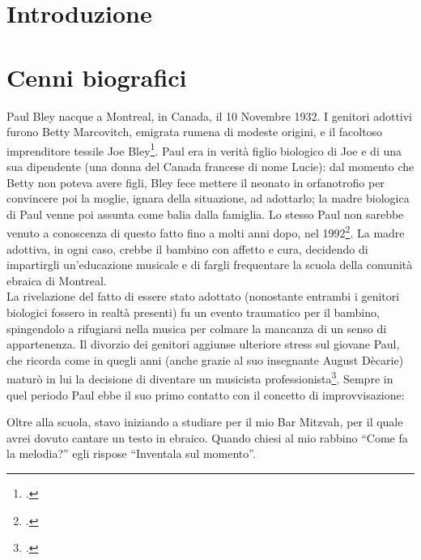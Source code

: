 \chapter{Introduzione}
\chapter{Cenni biografici}
Paul Bley nacque a Montreal, in Canada, il 10 Novembre 1932. I genitori adottivi furono Betty Marcovitch, emigrata rumena di modeste origini, e il facoltoso imprenditore tessile Joe Bley\footcite[10]{stopping}. Paul era in verità figlio biologico di Joe e di una sua dipendente (una donna del Canada francese di nome Lucie): dal momento che Betty non poteva avere figli, Bley fece mettere il neonato in orfanotrofio per convincere poi la moglie, ignara della situazione, ad adottarlo; la madre biologica di Paul venne poi assunta come balia dalla famiglia. Lo stesso Paul non sarebbe venuto a conoscenza di questo fatto fino a molti anni dopo, nel 1992\footcite[13]{stopping}. La madre adottiva, in ogni caso, crebbe il bambino con affetto e cura, decidendo di impartirgli un'educazione musicale e di fargli frequentare la scuola della comunità ebraica di Montreal.\\
La rivelazione del fatto di essere stato adottato (nonostante entrambi i genitori biologici fossero in realtà presenti) fu un evento traumatico per il bambino, spingendolo a rifugiarsi nella musica per colmare la mancanza di un senso di appartenenza. Il divorzio dei genitori aggiunse ulteriore stress sul giovane Paul, che ricorda come in quegli anni (anche grazie al suo insegnante August Dècarie) maturò in lui la decisione di diventare un musicista professionista\footcite[15]{stopping}. Sempre in quel periodo Paul ebbe il suo primo contatto con il concetto di improvvisazione:
\begin{fquote}
	Oltre alla scuola, stavo iniziando a studiare per il mio Bar Mitzvah, per il quale avrei dovuto cantare un testo in ebraico. Quando chiesi al mio rabbino ``Come fa la melodia?'' egli rispose ``Inventala sul momento''.
	\end{fquote}
\appendix
